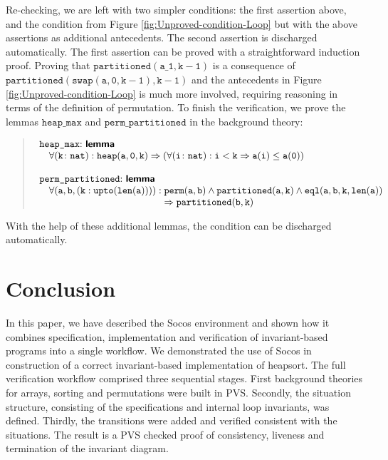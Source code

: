 \documentclass[english,submission]{eptcs}
\begin{document}
Re-checking, we are left with two simpler conditions:
the first assertion above, and the condition from Figure
\ref{fig:Unproved-condition-Loop} but with the above assertions as
additional antecedents. The second assertion is discharged
automatically. The first assertion can be proved with a
straightforward induction proof. Proving that
$\mathtt{partitioned(a\_1,k-1)}$ is a consequence of
$\mathtt{partitioned(swap(a,0,k-1),k-1)}$ and the antecedents in
Figure \ref{fig:Unproved-condition-Loop} is much more involved,
requiring reasoning in terms of the definition of permutation. To
finish the verification, we prove the lemmas $\texttt{heap\_max}$
and $\texttt{perm\_partitioned}$ in the background theory:
\begin{quote}
$\begin{array}[t]{l}
\texttt{heap\_max}\mathtt{:}\ \textsf{\textbf{lemma}}\\
\quad\mathtt{\forall(k\colon nat):heap(a,0,k)\Rightarrow(\forall(i\colon nat):i<k\Rightarrow a(i)\le a(0))}\\
\\
\texttt{perm\_partitioned}\mathtt{:}\ \textsf{\textbf{lemma}}\\
\quad\mathtt{\forall(a,b,(k:upto(len(a)))):\begin{array}[t]{@{}l}
\mathtt{perm(a,b)\land partitioned(a,k)\land eql(a,b,k,len(a))}\\
\mathtt{\Rightarrow partitioned(b,k)}
\end{array}}
\end{array}$
\end{quote}
With the help of these additional lemmas, the condition can be 
discharged automatically.


\section{Conclusion\label{sec:Conclusion}}

In this paper, we have described the Socos environment and shown how
it combines specification, implementation and verification of
invariant-based programs into a single workflow. We demonstrated the
use of Socos in construction of a correct invariant-based
implementation of heapsort.  The full verification workflow comprised
three sequential stages.  First background theories for arrays,
sorting and permutations were built in PVS. Secondly, the situation
structure, consisting of the specifications and internal loop
invariants, was defined. Thirdly, the transitions were added and
verified consistent with the situations. The result is a PVS checked
proof of consistency, liveness and termination of the invariant
diagram.
\end{document}
